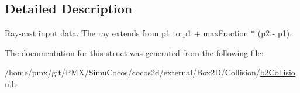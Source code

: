 \subsection{Detailed Description}
Ray-\/cast input data. The ray extends from p1 to p1 + max\+Fraction $\ast$ (p2 -\/ p1). 

The documentation for this struct was generated from the following file\+:\begin{DoxyCompactItemize}
\item 
/home/pmx/git/\+P\+M\+X/\+Simu\+Cocos/cocos2d/external/\+Box2\+D/\+Collision/\hyperlink{cocos2d_2external_2Box2D_2Collision_2b2Collision_8h}{b2\+Collision.\+h}\end{DoxyCompactItemize}
